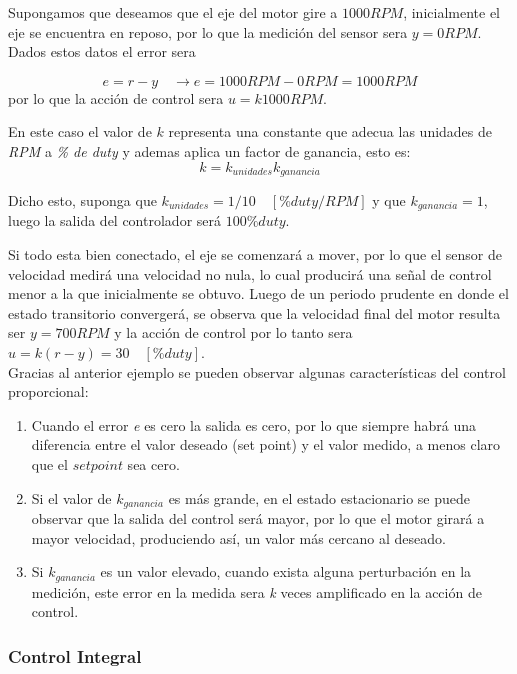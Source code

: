 \documentclass[10pt,conference,a4paper,onecolumn]{article}%
\begin{document}
Supongamos que deseamos que el eje del motor gire a $1000RPM$, inicialmente el eje se encuentra en reposo, por lo que la medición del sensor sera $y=0RPM$. Dados estos datos el error sera

 \begin{equation*}
e=r-y \quad \rightarrow e=1000RPM - 0RPM =1000RPM
\end{equation*}
por lo que la acción de control sera $u=k 1000RPM$.

En este caso el valor de $k$ representa una constante que adecua las unidades de \textit{RPM} a \textit{\% de duty} y ademas aplica un factor de ganancia, esto es:
 \begin{equation*}
k=k_{unidades}k_{ganancia}
\end{equation*}
 
 Dicho esto, suponga que $k_{unidades}=1/10 \quad [\%duty/RPM]$ y que $k_{ganancia}=1$, luego la salida del controlador será $100 \%duty$.
 
 Si todo esta bien conectado, el eje se comenzará a mover, por lo que el sensor de velocidad medirá una velocidad no nula, lo cual producirá una señal de control menor a la que inicialmente se obtuvo. Luego de un periodo prudente en donde el estado transitorio convergerá, se observa que la velocidad final del motor resulta ser $y=700RPM$ y la acción de control por lo tanto sera $u=k(r-y)=30\quad [\%duty]$. \\
 
 
 Gracias al anterior ejemplo se pueden observar algunas características del control proporcional:
 \begin{enumerate}
 \item \label{item_prop} Cuando el error \textit{e} es cero la salida es cero, por lo que siempre habrá una diferencia entre el valor deseado (set point) y el valor medido, a menos claro que el $set point$ sea cero.
 \item Si el valor de $k_{ganancia}$ es más grande, en el estado estacionario se puede observar que la salida del control será mayor, por lo que el motor girará a mayor velocidad, produciendo así, un valor más cercano al deseado.
 \item Si $k_{ganancia}$ es un valor elevado, cuando exista alguna perturbación en la medición, este error en la medida sera \textit{k} veces amplificado en la acción de control. 
 \end{enumerate}
 
 
 \subsubsection{Control Integral}
\end{document}
